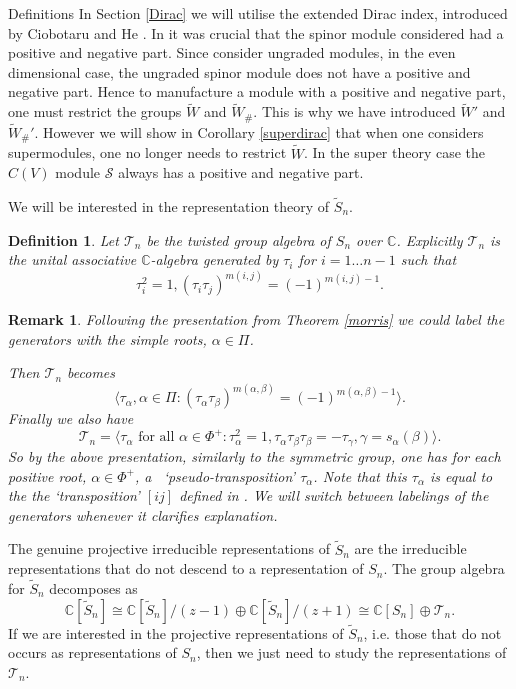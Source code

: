 \documentclass[a4paper,10pt]{amsart}
\newtheorem{definition}[theorem]{Definition}
\newtheorem{remark}[theorem]{Remark}
\begin{document}
\begin{section}{Definitions}
In Section \ref{Dirac} we will utilise the extended Dirac index, introduced by Ciobotaru and He \cite{CH15}. In \cite{CH15} it was crucial that the spinor module considered had a positive and negative part. Since \cite{CH15} consider ungraded modules, in the even dimensional case, the ungraded spinor module does not have a positive and negative part. Hence to manufacture a module with a positive and negative part, one must restrict the  groups $\tilde{W}$ and $\tilde{W}_\#$. This is why we have introduced $\tilde{W}'$ and $\tilde{W}_\#'$. However we will show in Corollary \ref{superdirac} that when one considers supermodules, one no longer needs to restrict $\tilde{W}$. In the super theory case the $C(V)$ module $\mathcal{S}$ always has a positive and negative part. 

We will be interested in the representation theory of $\tilde{S}_n$.
\begin{definition} \cite[p. 303]{S82} Let $\mathcal{T}_n$ be the twisted group algebra of $S_n$ over $\mathbb{C}$. Explicitly $\mathcal{T}_n$ is the unital associative $\mathbb{C}$-algebra generated by $\tau_i$ for $i = 1 \ldots n-1$ such that
$$\tau_i^2 = 1, (\tau_i \tau_j)^{m(i,j)} = (-1)^{m(i,j)-1}.$$
 \end{definition}


\begin{remark} Following the presentation from Theorem \ref{morris} we could label the generators with the simple roots, $\alpha \in \Pi$.

Then $\mathcal{T}_n$ becomes
$$\langle \tau_{\alpha}, \alpha \in \Pi : (\tau_\alpha\tau_\beta)^{m(\alpha,\beta)} = (-1)^{m(\alpha,\beta) -1} \rangle.$$
Finally we also have 
$$\mathcal{T}_n = \langle  \tau_\alpha \text{ for all } \alpha \in \Phi^+ : \tau_\alpha^2 = 1, \tau_\alpha \tau_\beta \tau_\beta = - \tau_\gamma, \gamma = s_\alpha(\beta)\rangle.$$
So by the above presentation, similarly to the symmetric group, one has for each positive root, $\alpha \in \Phi^+$, a \ `pseudo-transposition' $\tau_\alpha$. Note that this $\tau_\alpha$ is equal to the the `transposition' $[ij]$ defined in \cite[3.1]{BK01}.
We will switch between labelings of the generators whenever it clarifies explanation. 
\end{remark}


The genuine projective irreducible representations of $\tilde{S}_n$ are the irreducible representations that do not descend to a representation of $S_n$. The group algebra for $\tilde{S}_n$ decomposes as  
$$\mathbb{C}[\tilde{S}_n] \cong \mathbb{C}[\tilde{S}_n]/(z -1) \oplus \mathbb{C}[\tilde{S}_n ]/(z+1) \cong \mathbb{C}[S_n] \oplus \mathcal{T}_n.$$ If we are interested in the projective representations of $\tilde{S}_n$, i.e. those that do not occurs as representations of $S_n$, then we just need to study the representations of $\mathcal{T}_n$.


\end{section}
\end{document}
